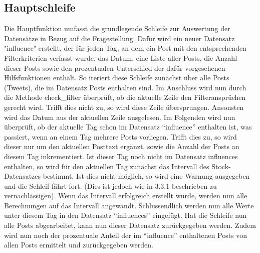 \documentclass{article}
\begin{document}
\subsection{Hauptschleife}
Die Hauptfunktion umfasst die grundlegende Schleife zur Auswertung der Datensätze in Bezug auf die Fragestellung.
Dafür wird ein neuer Datensatz "influence" erstellt, der für jeden Tag, an dem ein Post mit den entsprechenden Filterkriterien verfasst wurde, das Datum, eine Liste aller Posts, die Anzahl dieser Posts sowie den prozentualen Unterschied der dafür vorgesehenen Hilfsfunktionen enthält.
So iteriert diese Schleife zunächst über alle Posts (Tweets), die im Datensatz Posts enthalten sind.
Im Anschluss wird nun durch die Methode check\_filter überprüft, ob die aktuelle Zeile den Filteransprüchen gerecht wird.
Trifft dies nicht zu, so wird diese Zeile übersprungen.
Ansonsten wird das Datum aus der aktuellen Zeile ausgelesen.
Im Folgenden wird nun überprüft, ob der aktuelle Tag schon im Datensatz ``influence'' enthalten ist, was passiert, wenn an einem Tag mehrere Posts vorliegen. Trifft dies zu, so wird dieser nur um den aktuellen Posttext ergänzt, sowie die Anzahl der Posts an diesem Tag inkrementiert.
Ist dieser Tag noch nicht im Datensatz influences enthalten, so wird für den aktuellen Tag zunächst das Intervall des Stock-Datensatzes bestimmt.
Ist dies nicht möglich, so wird eine Warnung ausgegeben und die Schleif fährt fort.
(Dies ist jedoch wie in 3.3.1 beschrieben zu vernachlässigen).
Wenn das Intervall erfolgreich erstellt wurde, werden nun alle Berechnungen auf das Intervall angewandt.
Schlussendlich werden nun alle Werte unter diesem Tag in den Datensatz ``influences'' eingefügt.
Hat die Schleife nun alle Posts abgearbeitet, kann nun dieser Datensatz zurückgegeben werden.
Zudem wird nun noch der prozentuale Anteil der im ``influence'' enthaltenen Posts von allen Posts ermittelt und zurückgegeben werden.
\end{document}

